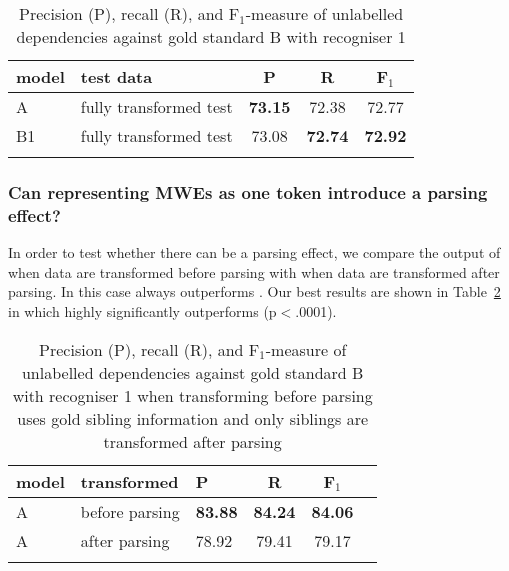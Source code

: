\documentclass[output=paper]{langsci/langscibook}
\begin{document}
\begin{table}[h]
    \footnotesize
    \def\arraystretch{1.20} 
    \centering
    \begin{tabular}{l l c c c} %
      \lsptoprule
        \textnormal{model}
        & \textnormal{test data}
        & \textnormal{P}
        & \textnormal{R}
        & \textnormal{F$_1$}
        \\ %
        \midrule
        A & fully transformed test &\textbf{73.15}  &72.38  & 72.77 \\
        B1 & fully transformed test &73.08  &\textbf{72.74}  & \textbf{72.92} \tabularnewline %
        \lspbottomrule
    \end{tabular}
    \caption{Precision (P), recall (R), and F$_1$-measure of unlabelled dependencies against gold standard B with recogniser 1 \label{del:tab:res1bis}}
\end{table}


\subsubsection{Can representing MWEs as one token introduce a parsing effect?}
\indent In order to test whether there can be a parsing effect, we compare the output of {\modelA} when data are transformed before parsing with {\modelA} when data are transformed after parsing. In this case {\modelB} always outperforms {\modelA}. Our best results are shown in Table~\ref{del:tab:res1bisbis} in which {\modelB} highly significantly outperforms {\modelA} (p$<$.0001).

\begin{table}[h]
    \footnotesize
    \def\arraystretch{1.20} 
    \centering
    \begin{tabular}{l l l c c c} %
      \lsptoprule
        \textnormal{model}
        & \textnormal{transformed}
        & \textnormal{P}
        & \textnormal{R}
        & \textnormal{F$_1$}
        \\ %
        \midrule
        A & before parsing &\textbf{83.88}  &\textbf{84.24}  & \textbf{84.06} \\
        A & after parsing &78.92  &79.41  & 79.17  \tabularnewline %
        \lspbottomrule
    \end{tabular}
    \caption{Precision (P), recall (R), and F$_1$-measure of unlabelled dependencies against gold standard B with recogniser 1 when transforming before parsing uses gold sibling information and only siblings are transformed after parsing\label{del:tab:res1bisbis}}
\end{table}
\end{document}
